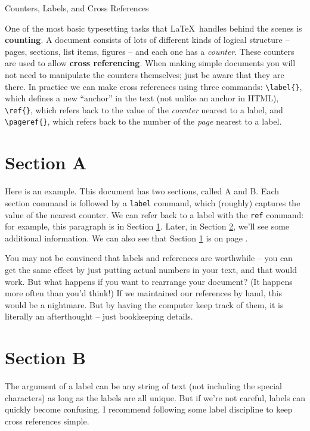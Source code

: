 \documentclass{article}
\begin{document}
\begin{center}
\Large Counters, Labels, and Cross References
\end{center}

One of the most basic typesetting tasks that \LaTeX\ handles behind the scenes is \textbf{counting}. A document consists of lots of different kinds of logical structure -- pages, sections, list items, figures -- and each one has a \emph{counter}. These counters are used to allow \textbf{cross referencing}. When making simple documents you will not need to manipulate the counters themselves; just be aware that they are there. In practice we can make cross references using three commands: \verb|\label{}|, which defines a new ``anchor'' in the text (not unlike an anchor in HTML), \verb|\ref{}|, which refers back to the value of the \emph{counter} nearest to a label, and \verb|\pageref{}|, which refers back to the number of the \emph{page} nearest to a label.

\section{Section A}\label{sec:A}

Here is an example. This document has two sections, called A and B. Each section command is followed by a \texttt{label} command, which (roughly) captures the value of the nearest counter. We can refer back to a label with the \texttt{ref} command: for example, this paragraph is in Section \ref{sec:A}. Later, in Section \ref{sec:B}, we'll see some additional information. We can also see that Section \ref{sec:A} is on page \pageref{sec:A}.

You may not be convinced that labels and references are worthwhile -- you can get the same effect by just putting actual numbers in your text, and that would work. But what happens if you want to rearrange your document? (It happens more often than you'd think!) If we maintained our references by hand, this would be a nightmare. But by having the computer keep track of them, it is literally an afterthought -- just bookkeeping details.

\section{Section B}\label{sec:B}

The argument of a label can be any string of text (not including the special characters) as long as the labels are all unique. But if we're not careful, labels can quickly become confusing. I recommend following some label discipline to keep cross references simple.
\end{document}
